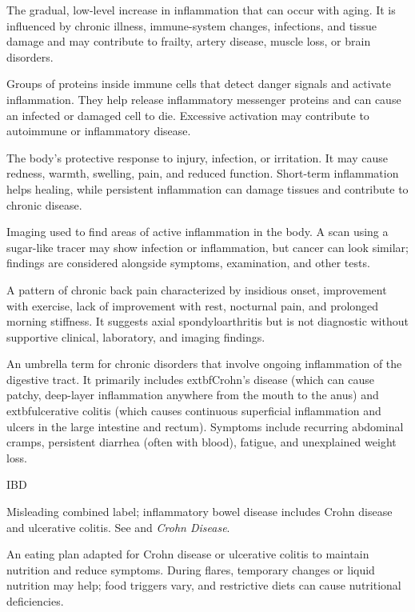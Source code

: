  The gradual, low-level increase in inflammation that can occur with aging. It is influenced by chronic illness, immune-system changes, infections, and tissue damage and may contribute to frailty, artery disease, muscle loss, or brain disorders.

 Groups of proteins inside immune cells that detect danger signals and activate inflammation. They help release inflammatory messenger proteins and can cause an infected or damaged cell to die. Excessive activation may contribute to autoimmune or inflammatory disease.

 The body’s protective response to injury, infection, or irritation. It may cause redness, warmth, swelling, pain, and reduced function. Short-term inflammation helps healing, while persistent inflammation can damage tissues and contribute to chronic disease.

 Imaging used to find areas of active inflammation in the body. A scan using a sugar-like tracer may show infection or inflammation, but cancer can look similar; findings are considered alongside symptoms, examination, and other tests.

 A pattern of chronic back pain characterized by insidious onset, improvement with
exercise, lack of improvement with rest, nocturnal pain, and prolonged morning
stiffness. It suggests axial spondyloarthritis but is not diagnostic without supportive
clinical, laboratory, and imaging findings.

 An umbrella term for chronic disorders that involve ongoing inflammation of the digestive tract. It primarily includes  extbf{Crohn's disease} (which can cause patchy, deep-layer inflammation anywhere from the mouth to the anus) and  extbf{ulcerative colitis} (which causes continuous superficial inflammation and ulcers in the large intestine and rectum). Symptoms include recurring abdominal cramps, persistent diarrhea (often with blood), fatigue, and unexplained weight loss.

\synonyms
IBD

 Misleading combined label; inflammatory bowel disease includes Crohn disease and ulcerative colitis. See  and \textit{Crohn Disease}.

 An eating plan adapted for Crohn disease or ulcerative colitis to maintain nutrition and reduce symptoms. During flares, temporary changes or liquid nutrition may help; food triggers vary, and restrictive diets can cause nutritional deficiencies.

